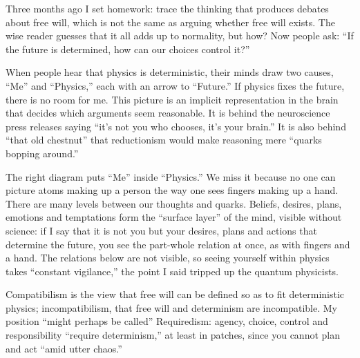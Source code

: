 
Three months ago I set homework: trace the thinking that produces debates about free will, which is not the same as arguing whether free will exists. The wise reader guesses that it all adds up to normality, but how? Now people ask: ``If the future is determined, how can our choices control it?''

When people hear that physics is deterministic, their minds draw two causes, ``Me'' and ``Physics,'' each with an arrow to ``Future.'' If physics fixes the future, there is no room for me. This picture is an implicit representation in the brain that decides which arguments seem reasonable.  It is behind the neuroscience press releases saying ``it's not you who chooses, it's your brain.''  It is also behind ``that old chestnut'' that reductionism would make reasoning mere ``quarks bopping around.'' 

The right diagram puts ``Me'' inside ``Physics.'' We miss it because no one can picture atoms making up a person the way one sees fingers making up a hand. There are many levels between our thoughts and quarks. Beliefs, desires, plans, emotions and temptations form the ``surface layer'' of the mind, visible without science: if I say that it is not you but your desires, plans and actions that determine the future, you see the part-whole relation at once, as with fingers and a hand. The relations below are not visible, so seeing yourself within physics takes ``constant vigilance,'' the point I said tripped up the quantum physicists. 

Compatibilism is the view that free will can be defined so as to fit deterministic physics; incompatibilism, that free will and determinism are incompatible. My position ``might perhaps be called'' Requiredism: agency, choice, control and responsibility ``require determinism,'' at least in patches, since you cannot plan and act ``amid utter chaos.'' 

